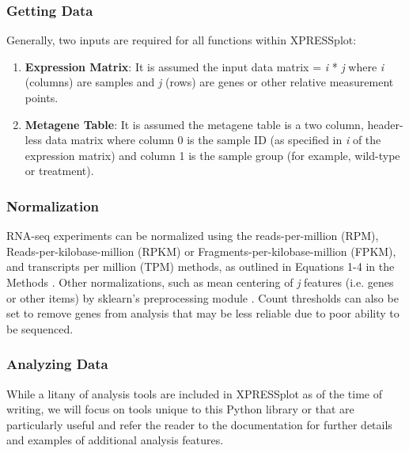 \documentclass[11pt, a4paper, oneside]{article}
\begin{document}
\subsubsection{Getting Data}
Generally, two inputs are required for all functions within XPRESSplot:

\begin{enumerate}
  \item \textbf{Expression Matrix}: It is assumed the input data matrix = \textit{i} * \textit{j} where \textit{i} (columns) are samples and \textit{j} (rows) are genes or other relative measurement points.
  \item \textbf{Metagene Table}: It is assumed the metagene table is a two column, header-less data matrix where column 0 is the sample ID (as specified in \textit{i} of the expression matrix) and column 1 is the sample group (for example, wild-type or treatment).
\end{enumerate}

\subsubsection{Normalization}
RNA-seq experiments can be normalized using the reads-per-million (RPM), Reads-per-kilobase-million (RPKM) or Fragments-per-kilobase-million (FPKM), and transcripts per million (TPM) methods, as outlined in Equations 1-4 in the Methods \cite{evans_briefbio}. Other normalizations, such as mean centering of \textit{j} features (i.e. genes or other items) by sklearn's preprocessing module \cite{scikit_learn}. Count thresholds can also be set to remove genes from analysis that may be less reliable due to poor ability to be sequenced.

\subsubsection{Analyzing Data}

While a litany of analysis tools are included in XPRESSplot as of the time of writing, we will focus on tools unique to this Python library or that are particularly useful and refer the reader to the documentation for further details and examples of additional analysis features.
\end{document}
